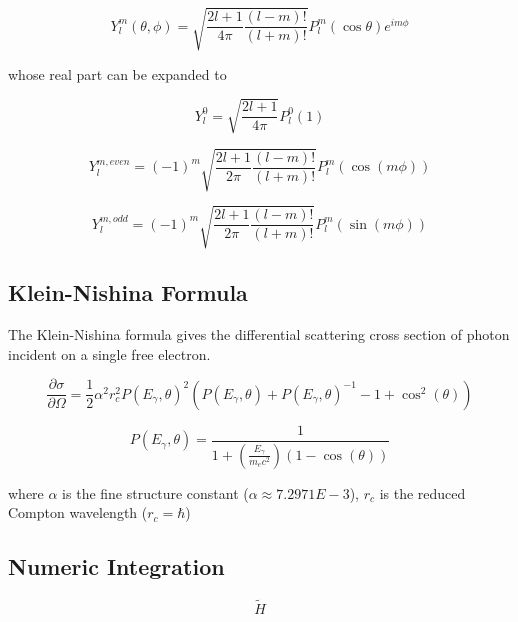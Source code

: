\documentclass{article}
\numberwithin{equation}{subsection}
\begin{document}
\begin{equation}
Y_l^m(\theta, \phi) = \sqrt{\frac{2l+1}{4 \pi}
\frac{(l-m)!}{(l+m)!}} P_l^m(\cos \theta) e^{im\phi}
\end{equation}

whose real part can be expanded to

\begin{equation}
Y_l^0 = \sqrt{\frac{2l+1}{4 \pi}}P_l^0(1)
\end{equation}

\begin{equation}
Y_l^{m, even} = (-1)^m\sqrt{\frac{2l+1}{2 \pi} \frac{(l-m)!}{(l+m)!}}P_l^m(\cos(m \phi))
\end{equation}

\begin{equation}
Y_l^{m,odd} = (-1)^m \sqrt{\frac{2l+1}{2 \pi} \frac{(l-m)!}{(l+m)!}}P_l^m(\sin(m \phi))
\end{equation}

\subsection{Klein-Nishina Formula}

The Klein-Nishina formula gives the differential scattering cross section of photon incident on a single free electron.

\begin{equation}\label{klein_nishina}
\frac{\partial \sigma}{\partial \Omega} = \frac{1}{2}\alpha^2 r_c^2 P(E_\gamma, \theta)^2
\left( P(E_\gamma, \theta) + P(E_\gamma, \theta)^{-1} - 1 + \cos^2(\theta) \right)
\end{equation}

\begin{equation}\label{klein_nishina2}
P(E_\gamma, \theta) = \frac{1}{1 + (\frac{E_\gamma}{m_e c^2})(1-\cos(\theta))}
\end{equation}


\noindent
where $\alpha$ is the fine structure constant ($\alpha \approx 7.2971E-3$), $r_c$ is the reduced Compton wavelength ($r_c = \hbar$)

\subsection{Numeric Integration}

\begin{equation}
\tilde{H}
\end{equation}
\end{document}
